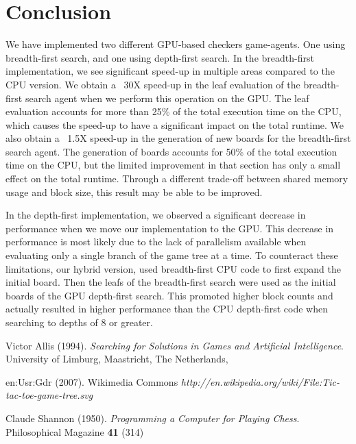 \documentclass[11pt]{article}
\begin{document}
\section{Conclusion}


We have implemented two different GPU-based checkers game-agents. One using
breadth-first search, and one using depth-first search. 
In the breadth-first implementation, we see significant speed-up in multiple
areas compared to the CPU version.
We obtain a ~30X speed-up in the leaf evaluation of the breadth-first search
agent when we perform this operation on the GPU. The leaf evaluation accounts
for more than 25\% of the total execution time on the CPU, which causes the
speed-up to have a significant impact on the total runtime.
We also obtain a ~1.5X speed-up in the generation of new boards for the
breadth-first search agent. The generation of boards accounts for 50\% of
the total execution time on the CPU, but the limited improvement in that 
section has only a small effect on the total runtime. Through a different
trade-off between shared memory usage and block size, this result may be
able to be improved.

In the depth-first implementation, we observed a significant decrease in performance
when we move our implementation to the GPU. 
This decrease in performance is most likely due to the lack of parallelism available when evaluating only a single branch of the game tree at a time. To counteract these limitations,
our hybrid version, used breadth-first CPU code to first expand the initial board. Then the leafs of the breadth-first search were used as the initial boards of the GPU depth-first search.
This promoted higher block counts and actually resulted in higher performance than the CPU depth-first code when searching to depths of 8 or greater.

\newpage
\begin{thebibliography}{9}

  Victor Allis
  (1994).
  \textit{Searching for Solutions in Games and Artificial Intelligence}.
  University of Limburg, Maastricht, The Netherlands,

  en:Usr:Gdr
  (2007).
  Wikimedia Commons
  \textit{http://en.wikipedia.org/wiki/File:Tic-tac-toe-game-tree.svg}

  Claude Shannon
  (1950).
  \textit{Programming a Computer for Playing Chess}.
  Philosophical Magazine \textbf{41} (314)




\end{thebibliography}
\end{document}
